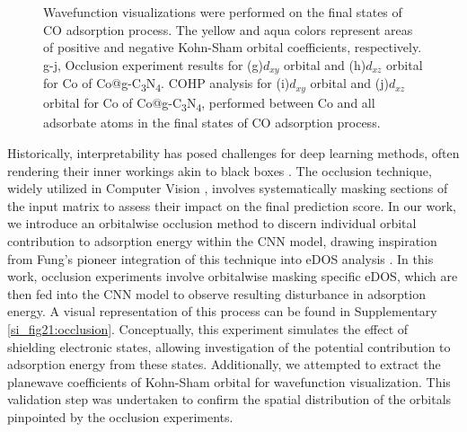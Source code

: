 \begin{figure}[htbp]
{    Wavefunction visualizations were performed on the final states of CO adsorption process.
    The yellow and aqua colors represent areas of positive and negative Kohn-Sham orbital coefficients, respectively.
    g-j, Occlusion experiment results for (g)$d_{xy}$ orbital and (h)$d_{xz}$ orbital for Co of Co@g-C\textsubscript{3}N\textsubscript{4}.
    COHP analysis for (i)$d_{xy}$ orbital and (j)$d_{xz}$ orbital for Co of Co@g-C\textsubscript{3}N\textsubscript{4}, performed between Co and all adsorbate atoms in the final states of CO adsorption process.}
    \label{main_fig4:validation}
\end{figure}

Historically, interpretability has posed challenges for deep learning methods, often rendering their inner workings akin to black boxes \cite{zhang2018interpretable, zhang2018visual, savage2022breaking}.
The occlusion technique, widely utilized in Computer Vision \cite{zeiler2014visualizing, kortylewski2020combining, wang2020robust}, involves systematically masking sections of the input matrix to assess their impact on the final prediction score.
In our work, we introduce an orbitalwise occlusion method to discern individual orbital contribution to adsorption energy within the CNN model, drawing inspiration from Fung's pioneer integration of this technique into eDOS analysis \cite{fung2021machine}.
In this work, occlusion experiments involve orbitalwise masking specific eDOS, which are then fed into the CNN model to observe resulting disturbance in adsorption energy.
A visual representation of this process can be found in Supplementary \cref{si_fig21:occlusion}. Conceptually, this experiment simulates the effect of shielding electronic states, allowing investigation of the potential contribution to adsorption energy from these states.
Additionally, we attempted to extract the planewave coefficients of Kohn-Sham orbital for wavefunction visualization.
This validation step was undertaken to confirm the spatial distribution of the orbitals pinpointed by the occlusion experiments.

